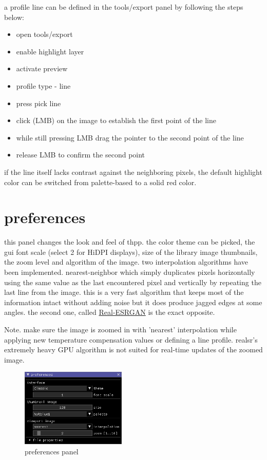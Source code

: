 \documentclass[12pt,twoside,a4paper,notitlepage]{report}
\begin{document}
a profile line can be defined in the tools/export panel by following the steps below:
\begin{itemize}
    \item open tools/export
    \item enable highlight layer
    \item activate preview
    \item profile type - line
    \item press pick line
    \item click (LMB) on the image to establish the first point of the line
    \item while still pressing LMB drag the pointer to the second point of the line
    \item release LMB to confirm the second point
\end{itemize}

if the line itself lacks contrast against the neighboring pixels, the default highlight color can be switched from palette-based to a solid red color.


\section{preferences} \label{sec:tools-preferences}

this panel changes the look and feel of thpp. the color theme can be picked, the gui font scale (select 2 for HiDPI displays), size of the library image thumbnails, the zoom level and algorithm of the image. two interpolation algorithms have been implemented. nearest-neighbor which simply duplicates pixels horizontally using the same value as the last encountered pixel and vertically by repeating the last line from the image. this is a very fast algorithm that keeps most of the information intact without adding noise but it does produce jagged edges at some angles. the second one, called \href{https://github.com/xinntao/Real-ESRGAN}{Real-ESRGAN} is the exact opposite.

Note. make sure the image is zoomed in with 'nearest' interpolation while applying new temperature compensation values or defining a line profile. realsr's extremely heavy GPU algorithm is not suited for real-time updates of the zoomed image. 

\begin{figure}[ht]
 \centering
 \includegraphics[width=5cm, keepaspectratio=true]{img/tools_preferences}
 \caption{preferences panel}
 \label{fig:tools-preferences}
\end{figure}
\end{document}
